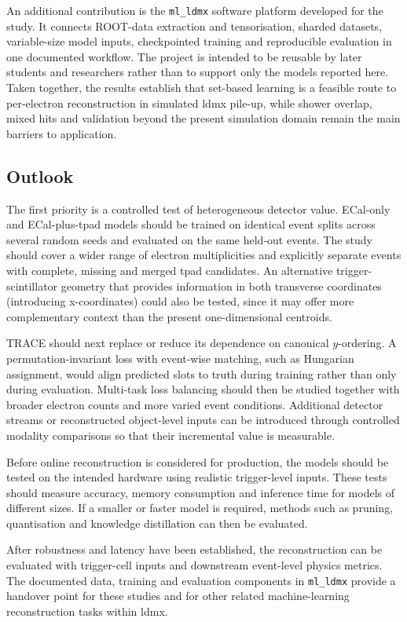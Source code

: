 An additional contribution is the \texttt{ml\_ldmx} software platform
developed for the study. It connects ROOT-data extraction and tensorisation,
sharded datasets, variable-size model inputs, checkpointed training and
reproducible evaluation in one documented workflow. The project is intended
to be reusable by later students and researchers rather than to support only
the models reported here. Taken together, the results establish that
set-based learning is a feasible route to per-electron reconstruction in
simulated \gls{ldmx} pile-up, while shower overlap, mixed hits and validation beyond
the present simulation domain remain the main barriers to application.

\subsection{Outlook}
\label{sec:outlook}

The first priority is a controlled test of heterogeneous detector value.
ECal-only and ECal-plus-\gls{tpad} models should be trained on identical event
splits across several random seeds and evaluated on the same held-out events.
The study should cover a wider range of electron multiplicities and explicitly
separate events with complete, missing and merged \gls{tpad} candidates. An
alternative trigger-scintillator geometry that provides information in both
transverse coordinates (introducing x-coordinates) could also be tested, since it may offer more
complementary context than the present one-dimensional centroids.

TRACE should next replace or reduce its dependence on
canonical \(y\)-ordering. A permutation-invariant loss with event-wise matching,
such as Hungarian assignment, would align predicted slots to truth during
training rather than only during evaluation. Multi-task loss balancing should
then be studied together with broader electron counts and more varied event
conditions. Additional detector streams or reconstructed object-level inputs
can be introduced through controlled modality comparisons so that their
incremental value is measurable.

Before online reconstruction is considered for production, the models should be tested on the
intended hardware using realistic trigger-level inputs. These tests should
measure accuracy, memory consumption and inference time for models of
different sizes. If a smaller or faster model is required, methods such as
pruning, quantisation and knowledge distillation can then be evaluated.


After robustness and latency have been established, the reconstruction can be
evaluated with trigger-cell inputs and downstream event-level physics metrics.
The documented data, training and evaluation components in \texttt{ml\_ldmx}
provide a handover point for these studies and for other related machine-learning
reconstruction tasks within \gls{ldmx}.